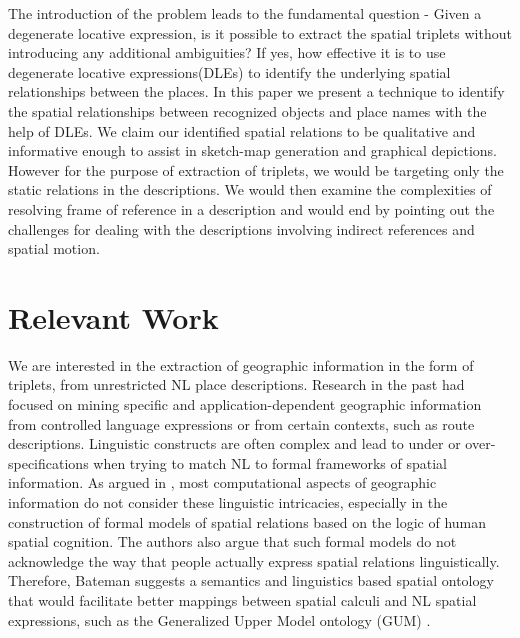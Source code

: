 \documentclass{acm_proc_article-sp}
\begin{document}
The introduction of the problem leads to the fundamental question - Given a degenerate locative expression, is it possible to extract the spatial triplets without introducing any additional ambiguities? If yes, how effective it is to use degenerate locative expressions(DLEs) to identify the underlying spatial relationships between the places. In this paper we present a technique to identify the spatial relationships between recognized objects and place names with the help of DLEs. We claim our identified spatial relations to be qualitative and informative enough to assist in sketch-map generation and graphical depictions. However for the purpose of extraction of triplets, we would be targeting only the static relations in the descriptions. We would then examine the complexities of resolving frame of reference in a description and would end by pointing out the challenges for dealing with the descriptions involving indirect references and spatial motion.
\section{Relevant Work}
We are interested in the extraction of geographic information in the form of triplets, from unrestricted NL place descriptions. Research in the past had focused on mining specific and application-dependent geographic information from controlled language expressions \cite{kelleher:perceptually, Hanjing:route, tappan:knowledge} or from certain contexts, such as route descriptions. Linguistic constructs are often complex and lead to under or over-specifications when trying to match NL to formal frameworks of spatial information. As argued in \cite{Bateman:ontology}, most computational aspects of geographic information do not consider these linguistic intricacies, especially in the construction of formal models of spatial relations based on the logic of human spatial cognition. The authors also argue that such formal models do not acknowledge the way that people actually express spatial relations linguistically. Therefore, Bateman \cite{Bateman:language} suggests a semantics and linguistics based spatial ontology that would facilitate better mappings between spatial calculi and NL spatial expressions, such as the Generalized Upper Model ontology (GUM) \cite{Bateman:data}. 
\end{document}
